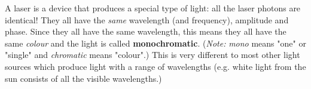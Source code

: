 
A laser is a device that produces a special type of light: all the laser photons are identical! They all have the \textit{same} wavelength (and frequency), amplitude and phase. Since they all have the same wavelength, this means they all have the same \textit{colour} and the light is called \textbf{monochromatic}. (\textit{Note:} \textit{mono} means "one" or "single" and \textit{chromatic} means "colour".) This is very different to most other light sources which produce light with a range of wavelengths (e.g. white light from the sun consists of all the visible wavelengths.)
 
